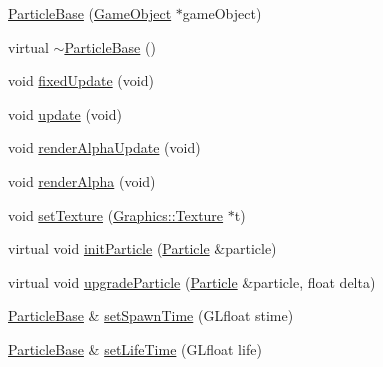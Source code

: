 \begin{DoxyCompactItemize}
\item 
\mbox{\hyperlink{class_beer_engine_1_1_component_1_1_particle_base_a100f4038f049b6b6217226d0d2d8801b}{Particle\+Base}} (\mbox{\hyperlink{class_beer_engine_1_1_game_object}{Game\+Object}} $\ast$game\+Object)
\item 
virtual \mbox{\hyperlink{class_beer_engine_1_1_component_1_1_particle_base_a8dbf0b7f418ae21894d94b81ccdd7117}{$\sim$\+Particle\+Base}} ()
\item 
void \mbox{\hyperlink{class_beer_engine_1_1_component_1_1_particle_base_a17d41a2cdf9174d5f86a6773c40e4d28}{fixed\+Update}} (void)
\item 
void \mbox{\hyperlink{class_beer_engine_1_1_component_1_1_particle_base_a2aad03916144a503ca8aee36637a5f76}{update}} (void)
\item 
void \mbox{\hyperlink{class_beer_engine_1_1_component_1_1_particle_base_a0cecaefb92ed219eb0ddc2771c513446}{render\+Alpha\+Update}} (void)
\item 
void \mbox{\hyperlink{class_beer_engine_1_1_component_1_1_particle_base_ab891afa6a5b2c99ffe94691bb5419588}{render\+Alpha}} (void)
\item 
void \mbox{\hyperlink{class_beer_engine_1_1_component_1_1_particle_base_a1a97e88564d79e122a7e1ccad7c2ab93}{set\+Texture}} (\mbox{\hyperlink{class_beer_engine_1_1_graphics_1_1_texture}{Graphics\+::\+Texture}} $\ast$t)
\item 
virtual void \mbox{\hyperlink{class_beer_engine_1_1_component_1_1_particle_base_a8d42fe68ec7c27aed419cde949ac278a}{init\+Particle}} (\mbox{\hyperlink{struct_beer_engine_1_1_component_1_1_particle}{Particle}} \&particle)
\item 
virtual void \mbox{\hyperlink{class_beer_engine_1_1_component_1_1_particle_base_a5add32f7be9357ac7a16f5d9a47337d2}{upgrade\+Particle}} (\mbox{\hyperlink{struct_beer_engine_1_1_component_1_1_particle}{Particle}} \&particle, float delta)
\item 
\mbox{\hyperlink{class_beer_engine_1_1_component_1_1_particle_base}{Particle\+Base}} \& \mbox{\hyperlink{class_beer_engine_1_1_component_1_1_particle_base_a9ae9fc6ba48e3b7d1eb7296b300d2964}{set\+Spawn\+Time}} (G\+Lfloat stime)
\item 
\mbox{\hyperlink{class_beer_engine_1_1_component_1_1_particle_base}{Particle\+Base}} \& \mbox{\hyperlink{class_beer_engine_1_1_component_1_1_particle_base_a7f4789dd5c5e53652abf2083d7a8e2f9}{set\+Life\+Time}} (G\+Lfloat life)
\item 

\end{DoxyCompactItemize}
